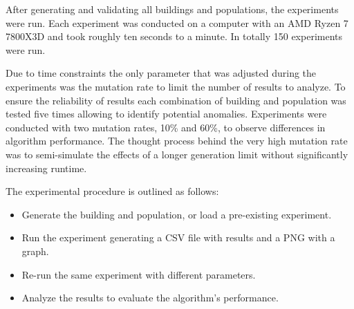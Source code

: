After generating and validating all buildings and populations, the experiments were run. Each experiment was conducted on a computer with an AMD Ryzen 7 7800X3D and took roughly ten seconds to a minute. In totally 150 experiments were run.

Due to time constraints the only parameter that was adjusted during the experiments was the mutation rate to limit the number of results to analyze.
To ensure the reliability of results each combination of building and population was tested five times allowing to identify potential anomalies. Experiments were conducted with two mutation rates, 10\% and 60\%, to observe differences in algorithm performance.
The thought process behind the very high mutation rate was to semi-simulate the effects of a longer generation limit without significantly increasing runtime.

The experimental procedure is outlined as follows:

\begin{itemize}
	\item Generate the building and population, or load a pre-existing experiment.
	\item Run the experiment generating a CSV file with results and a PNG with a graph.
	\item Re-run the same experiment with different parameters.
	\item Analyze the results to evaluate the algorithm's performance.
\end{itemize}
